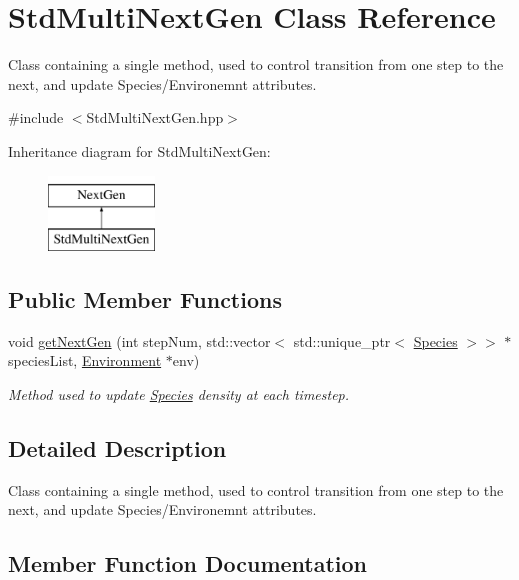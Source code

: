 \hypertarget{classStdMultiNextGen}{}\section{Std\+Multi\+Next\+Gen Class Reference}
\label{classStdMultiNextGen}


Class containing a single method, used to control transition from one step to the next, and update Species/\+Environemnt attributes.  




{\ttfamily \#include $<$Std\+Multi\+Next\+Gen.\+hpp$>$}

Inheritance diagram for Std\+Multi\+Next\+Gen\+:\begin{figure}[H]
\begin{center}
\leavevmode
\includegraphics[height=2.000000cm]{classStdMultiNextGen}
\end{center}
\end{figure}
\subsection*{Public Member Functions}
\begin{DoxyCompactItemize}
\item 
void \hyperlink{classStdMultiNextGen_a4e3a48cdc731da26abe8b1f32cdbf962}{get\+Next\+Gen} (int step\+Num, std\+::vector$<$ std\+::unique\+\_\+ptr$<$ \hyperlink{classSpecies}{Species} $>$$>$ $\ast$species\+List, \hyperlink{classEnvironment}{Environment} $\ast$env)
\begin{DoxyCompactList}\small\item\em Method used to update \hyperlink{classSpecies}{Species} density at each timestep. \end{DoxyCompactList}\end{DoxyCompactItemize}


\subsection{Detailed Description}
Class containing a single method, used to control transition from one step to the next, and update Species/\+Environemnt attributes. 

\subsection{Member Function Documentation}
\mbox{\label{classStdMultiNextGen_a4e3a48cdc731da26abe8b1f32cdbf962}} 
